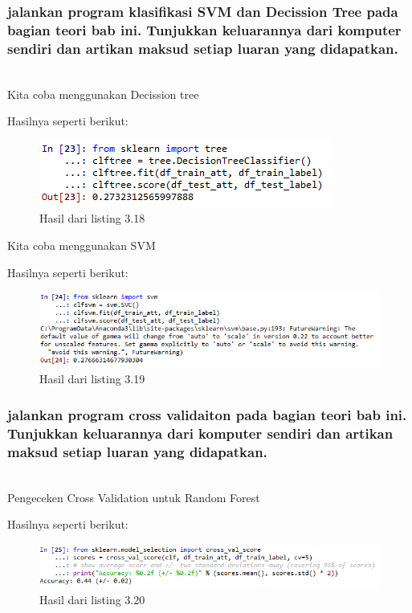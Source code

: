 \subsubsection{jalankan program klasiﬁkasi SVM dan Decission Tree pada bagian teori bab ini. Tunjukkan keluarannya dari komputer sendiri dan artikan maksud setiap luaran yang didapatkan.}
\hfill\\
Kita coba menggunakan Decission tree

Hasilnya seperti berikut:
\begin{figure}[H]
	\centering
	\includegraphics{figures/1174083/figures3/27.png}
	\caption{Hasil dari listing 3.18}
\end{figure}

Kita coba menggunakan SVM

Hasilnya seperti berikut:
\begin{figure}[H]
	\centering
	\includegraphics[width=12cm]{figures/1174083/figures3/28.png}
	\caption{Hasil dari listing 3.19}
\end{figure}

\subsubsection{jalankan program cross validaiton pada bagian teori bab ini. Tunjukkan keluarannya dari komputer sendiri dan artikan maksud setiap luaran yang didapatkan.}
\hfill\\
Pengeceken Cross Validation untuk Random Forest

Hasilnya seperti berikut:
\begin{figure}[H]
	\centering
	\includegraphics[width=12cm]{figures/1174083/figures3/29.png}
	\caption{Hasil dari listing 3.20}
\end{figure}

